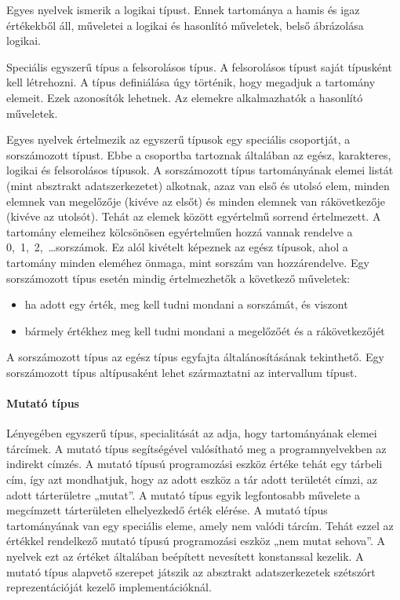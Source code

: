 Egyes nyelvek ismerik a logikai típust. Ennek tartománya a hamis és igaz értékekből áll, műveletei a logikai és hasonlító műveletek, belső ábrázolása logikai.

Speciális egyszerű típus a felsorolásos típus. A felsorolásos típust saját típusként kell létrehozni. A típus definiálása úgy történik, hogy megadjuk a tartomány elemeit. Ezek azonosítók lehetnek. Az elemekre alkalmazhatók a hasonlító műveletek.

Egyes nyelvek értelmezik az egyszerű típusok egy speciális csoportját, a sorszámozott típust. Ebbe a csoportba tartoznak általában az egész, karakteres, logikai és felsorolásos típusok. A sorszámozott típus tartományának elemei listát (mint absztrakt adatszerkezetet) alkotnak, azaz van első és utolsó elem, minden elemnek van megelőzője (kivéve az elsőt) és minden elemnek van rákövetkezője (kivéve az utolsót). Tehát az elemek között egyértelmű sorrend értelmezett. A tartomány elemeihez kölcsönösen egyértelműen hozzá vannak rendelve a 0,~1,~2,~\dots sorszámok. Ez alól kivételt képeznek az egész típusok, ahol a tartomány minden eleméhez önmaga, mint sorszám van hozzárendelve. Egy sorszámozott típus esetén mindig értelmezhetők a következő műveletek:
\begin{itemize}[noitemsep]
	\item ha adott egy érték, meg kell tudni mondani a sorszámát, és viszont
	\item bármely értékhez meg kell tudni mondani a megelőzőét és a rákövetkezőjét
\end{itemize}
A sorszámozott típus az egész típus egyfajta általánosításának tekinthető. Egy sorszámozott típus altípusaként lehet származtatni az intervallum típust.

\paragraph{Mutató típus} Lényegében egyszerű típus, specialitását az adja, hogy tartományának elemei tárcímek. A mutató típus segítségével valósítható meg a programnyelvekben az indirekt címzés. A mutató típusú programozási eszköz értéke tehát egy tárbeli cím, így azt mondhatjuk, hogy az adott eszköz a tár adott területét címzi, az adott tárterületre „mutat”. A mutató típus egyik legfontosabb művelete a megcímzett tárterületen elhelyezkedő érték elérése. A mutató típus tartományának van egy speciális eleme, amely nem valódi tárcím. Tehát ezzel az értékkel rendelkező mutató típusú programozási eszköz „nem mutat sehova”. A nyelvek ezt az értéket általában beépített nevesített konstanssal kezelik. A mutató típus alapvető szerepet játszik az absztrakt adatszerkezetek szétszórt reprezentációját kezelő implementációknál.

